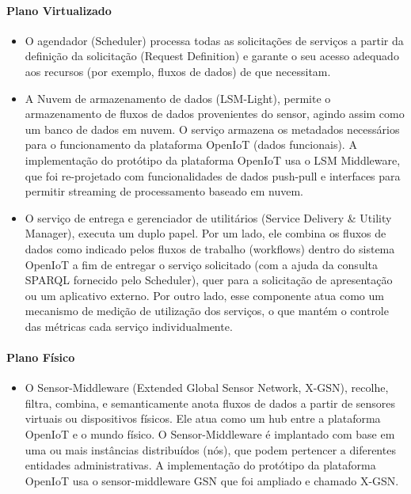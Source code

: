 \paragraph*{Plano Virtualizado}
\begin{itemize}
\item O agendador (Scheduler) processa todas as solicitações de serviços
a partir da definição da solicitação (Request Definition) e garante
o seu acesso adequado aos recursos (por exemplo, fluxos de dados)
de que necessitam. 
\item A Nuvem de armazenamento de dados (LSM-Light), permite o armazenamento
de fluxos de dados provenientes do sensor, agindo assim como um banco
de dados em nuvem. O serviço armazena os metadados necessários para
o funcionamento da plataforma OpenIoT (dados funcionais). A implementação
do protótipo da plataforma OpenIoT usa o LSM Middleware, que foi re-projetado
com funcionalidades de dados push-pull e interfaces para permitir
streaming de processamento baseado em nuvem.
\item O serviço de entrega e gerenciador de utilitários (Service Delivery
\& Utility Manager), executa um duplo papel. Por um lado, ele combina
os fluxos de dados como indicado pelos fluxos de trabalho (workflows)
dentro do sistema OpenIoT a fim de entregar o serviço solicitado (com
a ajuda da consulta SPARQL fornecido pelo Scheduler), quer para a
solicitação de apresentação ou um aplicativo externo. Por outro lado,
esse componente atua como um mecanismo de medição de utilização dos
serviços, o que mantém o controle das métricas cada serviço individualmente.
\end{itemize}

\paragraph*{Plano Físico}
\begin{itemize}
\item O Sensor-Middleware (Extended Global Sensor Network, X-GSN), recolhe,
filtra, combina, e semanticamente anota fluxos de dados a partir de
sensores virtuais ou dispositivos físicos. Ele atua como um hub entre
a plataforma OpenIoT e o mundo físico. O Sensor-Middleware é implantado
com base em uma ou mais instâncias distribuídos (nós), que podem pertencer
a diferentes entidades administrativas. A implementação do protótipo
da plataforma OpenIoT usa o sensor-middleware GSN que foi ampliado
e chamado X-GSN.
\end{itemize}


